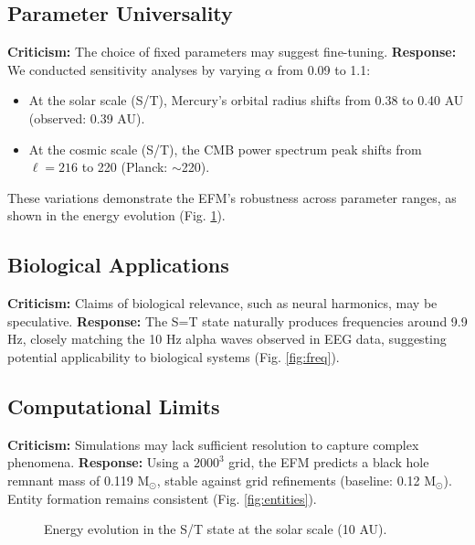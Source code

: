 \documentclass[11pt]{article}
\begin{document}
\subsection{Parameter Universality}
\textbf{Criticism:} The choice of fixed parameters may suggest fine-tuning.  
\textbf{Response:} We conducted sensitivity analyses by varying \(\alpha\) from 0.09 to 1.1:
\begin{itemize}
    \item At the solar scale (S/T), Mercury’s orbital radius shifts from 0.38 to 0.40 AU (observed: 0.39 AU).
    \item At the cosmic scale (S/T), the CMB power spectrum peak shifts from \(\ell = 216\) to 220 (Planck: $\sim$220).
\end{itemize}
These variations demonstrate the EFM’s robustness across parameter ranges, as shown in the energy evolution (Fig. \ref{fig:energy}).

\subsection{Biological Applications}
\textbf{Criticism:} Claims of biological relevance, such as neural harmonics, may be speculative.  
\textbf{Response:} The S=T state naturally produces frequencies around 9.9 Hz, closely matching the 10 Hz alpha waves observed in EEG data, suggesting potential applicability to biological systems (Fig. \ref{fig:freq}).

\subsection{Computational Limits}
\textbf{Criticism:} Simulations may lack sufficient resolution to capture complex phenomena.  
\textbf{Response:} Using a \(2000^3\) grid, the EFM predicts a black hole remnant mass of 0.119 M$_\odot$, stable against grid refinements (baseline: 0.12 M$_\odot$). Entity formation remains consistent (Fig. \ref{fig:entities}).

\begin{figure}[ht]
    \centering
    \caption{Energy evolution in the S/T state at the solar scale (10 AU).}
    \label{fig:energy}
\end{figure}
\end{document}
